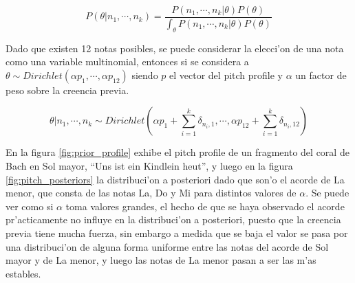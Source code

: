 $$P(\theta|n_1, \cdots, n_k) = \frac{P(n_1,\cdots, n_k | \theta) P(\theta)}{\int_{\theta}P(n_1, \cdots, n_k | \theta) P(\theta)}$$

Dado que existen 12 notas posibles, se puede considerar la elecci'on de una nota como una variable multinomial, entonces 
si se considera a $\theta \sim Dirichlet(\alpha p_1, \cdots, \alpha p_{12})$ siendo $p$ el vector del pitch profile y $\alpha$ un factor de peso sobre la creencia previa.

$$\theta | n_1, \cdots, n_k \sim Dirichlet(\alpha p_1 + \sum_{i=1}^k \delta_{n_i,1}, \cdots, \alpha p_{12} + \sum_{i=1}^k \delta_{n_i,12})$$

En la figura \ref{fig:prior_profile} exhibe el pitch profile de un fragmento del coral de Bach en Sol mayor, ``Uns ist ein Kindlein heut'', 
y luego en la figura \ref{fig:pitch_posteriors}
la distribuci'on a posteriori dado que son'o el acorde de La menor, que consta de las notas La, Do y Mi para distintos valores de $\alpha$. 
Se puede ver como si $\alpha$ toma valores grandes, el hecho
de que se haya observado el acorde pr'acticamente no influye en la distribuci'on a posteriori, puesto que la creencia previa tiene mucha fuerza, sin embargo a medida que se baja el valor se pasa por una 
distribuci'on de alguna forma uniforme entre las notas del acorde de Sol mayor y de La menor, y luego las notas de La menor pasan a ser las m'as estables.

\begin{imagen}
    \width{10cm}
\end{imagen}

